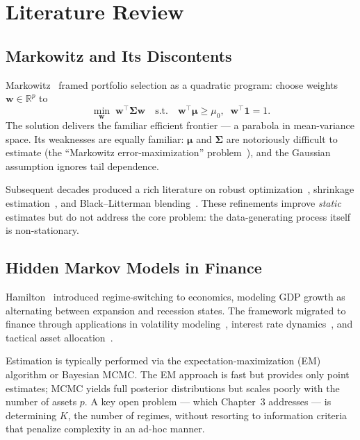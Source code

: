 \documentclass[12pt,oneside]{book}
\begin{document}
\chapter{Literature Review}

\section{Markowitz and Its Discontents}

Markowitz~\cite{markowitz1952} framed portfolio selection as a quadratic program: choose weights $\mathbf{w} \in \mathbb{R}^p$ to
\begin{equation}
\min_{\mathbf{w}}\; \mathbf{w}^{\!\top}\boldsymbol{\Sigma}\mathbf{w} \quad \text{s.t.} \quad \mathbf{w}^{\!\top}\boldsymbol{\mu} \geq \mu_0,\;\; \mathbf{w}^{\!\top}\mathbf{1} = 1.
\label{eq:markowitz}
\end{equation}
The solution delivers the familiar efficient frontier --- a parabola in mean-variance space. Its weaknesses are equally familiar: $\boldsymbol{\mu}$ and $\boldsymbol{\Sigma}$ are notoriously difficult to estimate (the ``Markowitz error-maximization'' problem~\cite{michaud1989}), and the Gaussian assumption ignores tail dependence.

Subsequent decades produced a rich literature on robust optimization~\cite{fabozzi2007}, shrinkage estimation~\cite{ledoit2004}, and Black--Litterman blending~\cite{black1992}. These refinements improve \textit{static} estimates but do not address the core problem: the data-generating process itself is non-stationary.

\section{Hidden Markov Models in Finance}

Hamilton~\cite{hamilton1989} introduced regime-switching to economics, modeling GDP growth as alternating between expansion and recession states. The framework migrated to finance through applications in volatility modeling~\cite{timmermann2000}, interest rate dynamics~\cite{ang2002}, and tactical asset allocation~\cite{guidolin2007}.

Estimation is typically performed via the expectation-maximization (EM) algorithm or Bayesian MCMC. The EM approach is fast but provides only point estimates; MCMC yields full posterior distributions but scales poorly with the number of assets $p$. A key open problem --- which Chapter~3 addresses --- is determining $K$, the number of regimes, without resorting to information criteria that penalize complexity in an ad-hoc manner.
\end{document}
